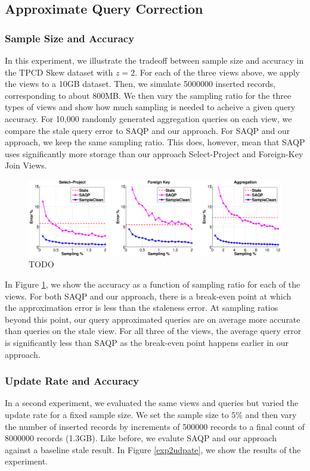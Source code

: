 \subsection{Approximate Query Correction}

\subsubsection{Sample Size and Accuracy}
In this experiment, we illustrate the tradeoff between sample size and accuracy in the TPCD Skew dataset with $z = 2$.
For each of the three views above, we apply the views to a 10GB dataset.
Then, we simulate 5000000 inserted records, corresponding to about 800MB.
We then vary the sampling ratio for the three types of views and show how much sampling is needed to acheive a given query accuracy.
For 10,000 randomly generated aggregation queries on each view, we compare the stale query error to SAQP and our approach.
For SAQP and our approach, we keep the same sampling ratio.
This does, however, mean that SAQP uses significantly more storage than our approach Select-Project and Foreign-Key Join Views.

\begin{figure}[ht!]
\label{exp1sample}
\centering
 \includegraphics[width=\textwidth]{exp/exp1-samplesize-accuracy.eps}
 \caption{TODO}
\end{figure}

In Figure \ref{exp1sample}, we show the accuracy as a function of sampling ratio for each of the views.
For both SAQP and our approach, there is a break-even point at which the approximation error is less than the staleness error.
At sampling ratios beyond this point, our query approximated queries are on average more accurate than queries on the stale view.
For all three of the views, the average query error is significantly less than SAQP as the break-even point happens earlier in our approach.

\subsubsection{Update Rate and Accuracy}
In a second experiment, we evaluated the same views and queries but varied the update rate for a fixed sample size.
We set the sample size to $5\%$ and then vary the number of inserted records by increments of 500000 records to a final count of 8000000 records (1.3GB).
Like before, we evalute SAQP and our approach against a baseline stale result.
In Figure \ref{exp2udpate}, we show the results of the experiment. 

